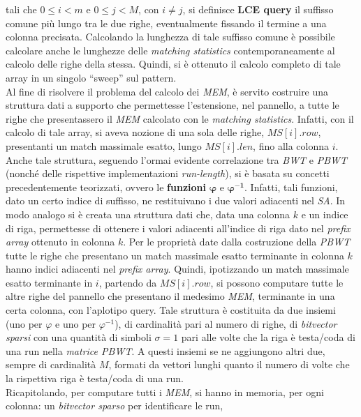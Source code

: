 \documentclass[a4paper,11pt, oneside]{article}
\begin{document}
tali che $0\leq i <m$ e $0\leq j <M$, con $i\neq j$, si definisce \textbf{LCE
  query} il suffisso comune più lungo tra le due righe, eventualmente fissando
il termine a una colonna precisata. Calcolando la
lunghezza di tale suffisso comune è possibile calcolare anche le
lunghezze delle \textit{matching statistics} contemporaneamente al calcolo delle
righe della stessa. Quindi, si è ottenuto il calcolo completo di tale array in
un singolo ``sweep'' sul pattern.\\
Al fine di risolvere il problema del calcolo dei \textit{MEM}, è
servito 
costruire una struttura dati a supporto che permettesse l'estensione, nel
pannello, a tutte le righe che presentassero il \textit{MEM} calcolato con le
\textit{matching statistics}. Infatti, con il calcolo di tale array, si aveva
nozione di una sola delle righe, $MS[i].row$, presentanti un match massimale
esatto, lungo 
$MS[i].len$, fino alla colonna $i$. Anche tale struttura, seguendo l'ormai
evidente correlazione tra \textit{BWT} e \textit{PBWT} (nonché delle rispettive
implementazioni \textit{run-length}), si è basata su concetti precedentemente
teorizzati, ovvero le \textbf{funzioni} $\boldsymbol\varphi$ e
$\boldsymbol\varphi^{\mathbf{-1}}$. Infatti, tali
funzioni, dato un certo indice di suffisso, ne restituivano i due valori
adiacenti nel \textit{SA}. In
modo analogo si è creata una struttura dati che, data una colonna $k$ e un
indice di riga, permettesse di ottenere i valori adiacenti all'indice di riga
dato nel \textit{prefix array} ottenuto in colonna $k$. Per le proprietà date
dalla costruzione della \textit{PBWT} tutte le righe che presentano un match
massimale esatto terminante in colonna $k$ hanno indici adiacenti nel
\textit{prefix array}. Quindi, ipotizzando un match massimale esatto terminante
in $i$, partendo da 
$MS[i].row$, si possono computare tutte le altre righe del pannello che
presentano il medesimo \textit{MEM}, terminante in una certa colonna, con
l'aplotipo query. Tale 
struttura è costituita 
da due insiemi (uno per $\varphi$ e uno per $\varphi^{-1}$), di cardinalità pari
  al numero di righe, di \textit{bitvector sparsi} con una quantità di simboli 
$\sigma=1$ pari alle volte che la riga è testa/coda di una run nella
\textit{matrice PBWT}. A questi insiemi
se ne aggiungono altri due, sempre di cardinalità
$M$, formati da vettori lunghi 
quanto il numero di volte che la rispettiva riga è testa/coda di una run.\\
Ricapitolando, per computare tutti i \textit{MEM}, si hanno in
memoria, per ogni colonna: un \textit{bitvector sparso} per identificare le run,
\end{document}
